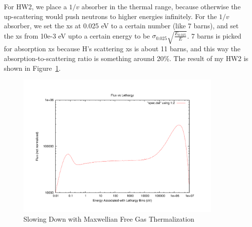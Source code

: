 \documentclass{school-22.211-notes}
\begin{document}
For HW2, we place a $1/v$ absorber in the thermal range, because otherwise the up-scattering would push neutrons to higher energies infinitely. For the $1/v$ absorber, we set the xs at 0.025 eV to a certain number (like 7 barns), and set the xs from 10e-3 eV upto a certain energy to be $\sigma_{0.025} \sqrt{\frac{E_{0.025}}{E}}$. 7 barns is picked for absorption xs because H's scattering xs is about 11 barns, and this way the absorption-to-scattering ratio is something around 20\%. The result of my HW2 is shown in Figure~\ref{pset2}.
\begin{figure}
  \centering
  \includegraphics[width=4in]{images/spec.uncrop.pdf}
  \caption{Slowing Down with Maxwellian Free Gas Thermalization} \label{pset2}
\end{figure}
\end{document}
